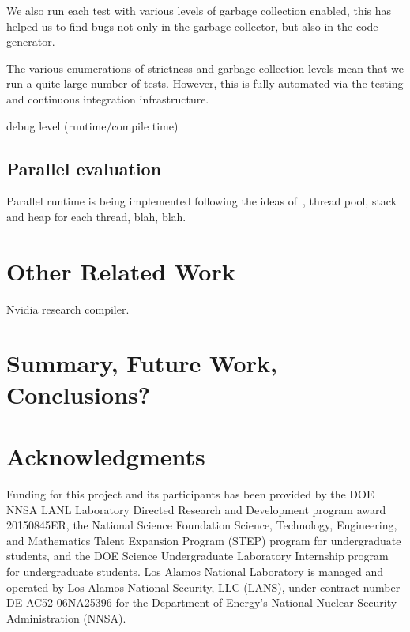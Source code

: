 \documentclass{llncs}
\begin{document}
We also run each test with various levels of garbage collection enabled, this
has helped us to find bugs not only in the garbage collector, but also in the
code generator.

The various enumerations of strictness and garbage collection levels mean that
we run a quite large number of tests. However, this is fully automated via the
testing and continuous integration infrastructure.

debug level (runtime/compile time)

\subsection{Parallel evaluation}

Parallel runtime is being implemented following the ideas
of~\cite{SPJs-many-papers}, thread pool, stack and heap for each thread, blah,
blah.

\section{Other Related Work}
Nvidia research compiler.

\section{Summary, Future Work, Conclusions?}

\section{Acknowledgments}

Funding for this project and its participants has been provided by the DOE
NNSA LANL Laboratory Directed Research and Development program award
20150845ER, the National Science Foundation Science, Technology, Engineering,
and Mathematics Talent Expansion Program (STEP) program for undergraduate
students, and the DOE Science Undergraduate Laboratory Internship program for
undergraduate students.
%
Los Alamos National Laboratory is managed and operated by Los Alamos National
Security, LLC (LANS), under contract number DE-AC52-06NA25396 for the
Department of Energy’s National Nuclear Security Administration (NNSA).

\cite{ghc-as-library}
\cite{Heren02}

%
%




\end{document}
